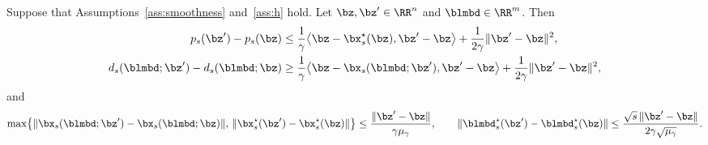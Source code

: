 \begin{lemma}
\label{lem:b2-prime-center-dependence}
Suppose that Assumptions~\ref{ass:smoothness} and~\ref{ass:h} hold. Let
\(\bz,\bz'\in\RR^n\) and \(\blmbd\in\RR^m\). Then
\begin{align*}
    p_s(\bz')-p_s(\bz)
    &\le\frac1\gamma\bigl\langle\bz-\bx_s^\star(\bz),\bz'-\bz\bigr\rangle
    +\frac{1}{2\gamma}\|\bz'-\bz\|^2,\\
    d_s(\blmbd;\bz')-d_s(\blmbd;\bz)
    &\ge\frac1\gamma\bigl\langle\bz-\bx_s(\blmbd;\bz'),\bz'-\bz\bigr\rangle
    +\frac{1}{2\gamma}\|\bz'-\bz\|^2 ,
\end{align*}
and
\[
    \max\bigl\{\|\bx_s(\blmbd;\bz')-\bx_s(\blmbd;\bz)\|,\,
    \|\bx_s^\star(\bz')-\bx_s^\star(\bz)\|\bigr\}
    \le\frac{\|\bz'-\bz\|}{\gamma\mu_\gamma},
    \qquad
    \|\blmbd_s^\star(\bz')-\blmbd_s^\star(\bz)\|
    \le\frac{\sqrt{s}\,\|\bz'-\bz\|}{2\gamma\sqrt{\mu_\gamma}} .
\]
\end{lemma}

